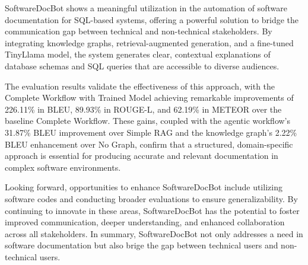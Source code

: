 \documentclass[11pt]{article}
\begin{document}
SoftwareDocBot shows a meaningful utilization in the automation of software documentation for SQL-based systems, offering a powerful solution to bridge the communication gap between technical and non-technical stakeholders. By integrating knowledge graphs, retrieval-augmented generation, and a fine-tuned TinyLlama model, the system generates clear, contextual explanations of database schemas and SQL queries that are accessible to diverse audiences.

The evaluation results validate the effectiveness of this approach, with the Complete Workflow with Trained Model achieving remarkable improvements of 226.11\% in BLEU, 89.93\% in ROUGE-L, and 62.19\% in METEOR over the baseline Complete Workflow. These gains, coupled with the agentic workflow’s 31.87\% BLEU improvement over Simple RAG and the knowledge graph’s 2.22\% BLEU enhancement over No Graph, confirm that a structured, domain-specific approach is essential for producing accurate and relevant documentation in complex software environments.

Looking forward, opportunities to enhance SoftwareDocBot include utilizing software codes and conducting broader evaluations to ensure generalizability. By continuing to innovate in these areas, SoftwareDocBot has the potential to foster improved communication, deeper understanding, and enhanced collaboration across all stakeholders. In summary, SoftwareDocBot not only addresses a need in software documentation but also brige the gap between technical users and non-technical users.




\end{document}
